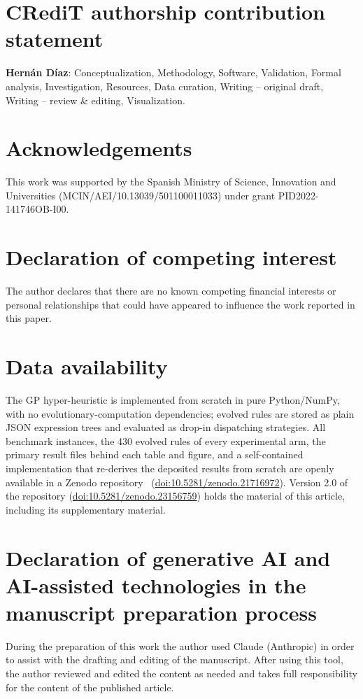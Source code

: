 \documentclass[preprint,number,sort&compress,12pt]{elsarticle}
\begin{document}
\section*{CRediT authorship contribution statement}
\textbf{Hern\'an D\'iaz}: Conceptualization, Methodology, Software,
Validation, Formal analysis, Investigation, Resources, Data curation,
Writing -- original draft, Writing -- review \& editing, Visualization.

\section*{Acknowledgements}
This work was supported by the Spanish Ministry of Science, Innovation
and Universities (MCIN/AEI/10.13039/501100011033) under grant
PID2022-141746OB-I00.

\section*{Declaration of competing interest}
The author declares that there are no known competing financial
interests or personal relationships that could have appeared to
influence the work reported in this paper.

\section*{Data availability}
The GP hyper-heuristic is implemented from scratch in pure Python/NumPy,
with no evolutionary-computation dependencies; evolved rules are stored
as plain JSON expression trees and evaluated as drop-in dispatching
strategies. All benchmark
instances, the 430 evolved rules of every experimental arm, the primary
result files behind each table and figure, and a self-contained
implementation that re-derives the deposited results from scratch are
openly available in a Zenodo repository~\citep{DiazDataset2026}
(\href{https://doi.org/10.5281/zenodo.21716972}{doi:10.5281/zenodo.21716972}).
Version 2.0 of the repository
(\href{https://doi.org/10.5281/zenodo.23156759}{doi:10.5281/zenodo.23156759})
holds the material of this article, including its supplementary
material.

\section*{Declaration of generative AI and AI-assisted technologies in
the manuscript preparation process}
During the preparation of this work the author used Claude (Anthropic)
in order to assist with the drafting and editing of the manuscript.
After using this tool, the author reviewed and edited the content as
needed and takes full responsibility for the content of the published
article.



\end{document}
